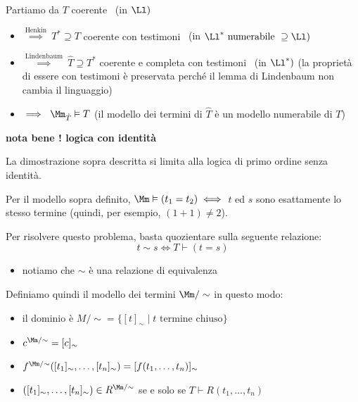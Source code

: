 \documentclass[a4paper,11pt]{report}
\begin{document}
\begin{proofframe}[title=passi per dimostrare la Completezza]
    Partiamo da \( T \) coerente \  {\color{CadetBlue}(in \( \Ll) \)}
    \begin{itemize}
        \item \( \overset{\text{Henkin}}{\implies} \ T^* \supseteq T \) coerente con testimoni \  {\color{CadetBlue}(in \( \Ll^* \text{ numerabile } \supseteq \Ll) \)}

        \item \( \overset{\text{Lindenbaum}}{\implies} \ \hat T \supseteq T^*\) coerente e completa con testimoni \ {\color{CadetBlue}(in \( \Ll^*)\)
            \subitem (la proprietà di essere con testimoni è preservata perché il lemma di Lindenbaum non cambia il linguaggio)}
        \item \( \implies \ \Mm_{\hat T} \vDash  T \)  (il modello dei termini di \( \hat T \) è un modello numerabile di \( T \))

    \end{itemize}
    
\end{proofframe}

\textbf{nota bene ! logica con identità}

La dimostrazione sopra descritta si limita alla logica di primo ordine senza identità.

Per il modello sopra definito, \( \Mm \vDash (t_1 = t_2) \iff \) \( t \) ed \( s \) sono esattamente lo stesso termine {\color{gray}(quindi, per esempio, \( (1+1) \neq 2 \))}.

Per risolvere questo problema, basta quozientare sulla seguente relazione:
\[ t \sim s \iff T\vdash(t = s) \]

\begin{itemize}
    \item notiamo che \( \sim \) è una relazione di equivalenza
\end{itemize}

Definiamo quindi il modello dei termini \( \Mm/\sim \) in questo modo:
\begin{itemize}
    \item il dominio è \( M/\sim = \{[t]_\sim \mid t \text{ termine chiuso}\}\)
    \item \( c^{\Mm/\sim} = [c]_\sim\)
    \item \( f^{\Mm/\sim}([t_1]_{\sim}, \dots, [t_n]_{\sim}) = [f(t_1, \dots, t_n)]_{\sim} \)
    \item \(([t_1]_{\sim}, \dots, [t_n]_{\sim}) \in R^{\Mm/\sim}\) se e solo se \(T \vdash R(t_1, \dots, t_n)\)
\end{itemize}
\end{document}
